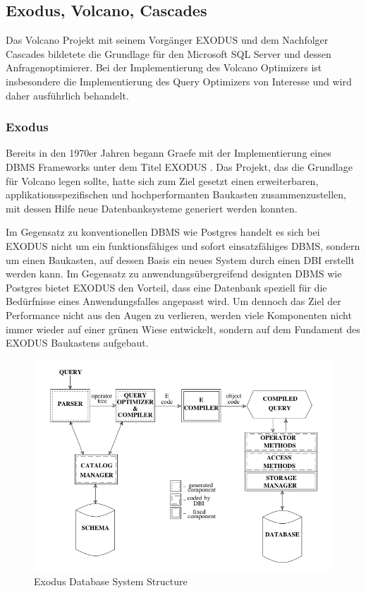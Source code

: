 \subsection{Exodus, Volcano, Cascades}

Das Volcano Projekt mit seinem Vorgänger \ac{EXODUS} und dem Nachfolger Cascades bildetete die Grundlage für den Microsoft SQL Server und dessen Anfragenoptimierer. Bei der Implementierung des Volcano Optimizers ist insbesondere die Implementierung des Query Optimizers von Interesse und wird daher ausführlich behandelt.

\subsubsection{Exodus}


Bereits in den 1970er Jahren begann Graefe mit der Implementierung eines DBMS Frameworks unter dem Titel EXODUS \cite{carey1990exodus} . Das Projekt, das die Grundlage für Volcano legen sollte, hatte sich zum Ziel gesetzt einen erweiterbaren, applikationsspezifischen und hochperformanten Baukasten zusammenzustellen, mit dessen Hilfe neue Datenbanksysteme generiert werden konnten. 

Im Gegensatz zu konventionellen DBMS wie Postgres handelt es sich bei EXODUS nicht um ein funktionsfähiges und sofort einsatzfähiges DBMS, sondern um einen Baukasten, auf dessen Basis ein neues System durch einen DBI erstellt werden kann. Im Gegensatz zu anwendungsübergreifend designten DBMS wie Postgres bietet EXODUS den Vorteil, dass eine Datenbank speziell für die Bedürfnisse eines Anwendungsfalles angepasst wird. Um dennoch das Ziel der Performance nicht aus den Augen zu verlieren, werden viele Komponenten nicht immer wieder auf einer grünen Wiese entwickelt, sondern auf dem Fundament des EXODUS Baukastens aufgebaut.

\begin{figure}[h]
  \centering
  \includegraphics[width=\textwidth]{02_Grundlagen/ExodusDatabaseSystemStructure.png}
  \caption{Exodus Database System Structure}
\end{figure}

